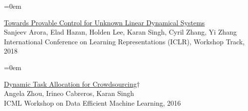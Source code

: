 \documentclass{scrartcl}
\newcommand{\Description}[1]{\hangindent=0em\hangafter=0\noindent\raggedright {#1}\par\normalsize\vspace{1em}}
\begin{document}
\begin{cv}{}
\Description{\href{https://openreview.net/pdf?id=HJGuXK1vM}{Towards Provable Control for Unknown Linear Dynamical Systems}\\
Sanjeev Arora, Elad Hazan, Holden Lee, Karan Singh, Cyril Zhang, Yi Zhang\\ International Conference on Learning Representations (ICLR), Workshop Track, 2018}

\Description{\href{https://arxiv.org/pdf/1701.08795.pdf}{Dynamic Task Allocation for Crowdsourcing$\dagger$} \\ Angela Zhou, Irineo Cabreros, Karan Singh \\ ICML Workshop on Data Efficient Machine Learning, 2016}

\end{cv}
\end{document}
